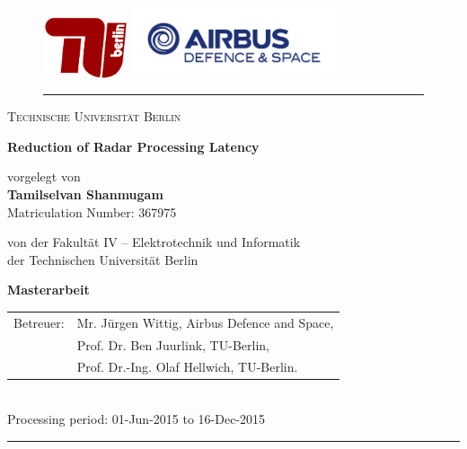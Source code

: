 \begin{titlepage}
  \begin{center}

    \begin{figure}[!htb]
      	\includegraphics[width=2.5cm, height=1.8cm]{figures/tub.pdf}
    \endminipage\hfill
    \vspace*{0.25cm}
    \hspace*{-0.5cm}
      \includegraphics[width=60mm]{figures/AIRBUS_DS_Flat_RGB} 
    \endminipage \hfill
    \rule{\hsize}{1.2pt}
    \end{figure}
	
	\vspace{0.7em}
	\LARGE 
	\textsc{Technische Universit\"at Berlin}

    \vspace{1.5cm}
    \sffamily \LARGE \textbf{Reduction of Radar Processing Latency}

    \vspace{1.5cm}
    \normalsize vorgelegt von \\
    \vspace{.1cm}
    \large \textbf{Tamilselvan Shanmugam} \\
    \vspace{0.2cm}
    \normalsize Matriculation Number: 367975 \\
    \vspace{1.8cm}

    \normalsize von der Fakult\"{a}t IV -- Elektrotechnik und Informatik\\
    \normalsize der Technischen Universit\"{a}t Berlin\\
    \vspace{2cm}

    \large \textbf{Masterarbeit}
    \vspace{.2cm}

		\begin{tabular}{rl}
		Betreuer:	& Mr. J\"{u}rgen Wittig, Airbus Defence and Space,\\
						& Prof. Dr. Ben Juurlink, TU-Berlin, \\
						& Prof. Dr.-Ing. Olaf Hellwich, TU-Berlin. \\
		\end{tabular}\\

    \vspace{2.5cm}
    \large Processing period: 01-Jun-2015 to 16-Dec-2015\\
    \rule{\hsize}{1.2pt}

  \end{center}
\end{titlepage}
\thispagestyle{empty}
